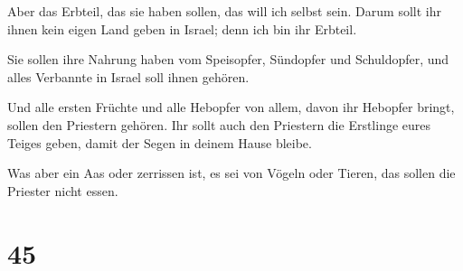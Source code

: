  Aber das Erbteil, das sie haben sollen, das will ich
selbst sein. Darum sollt ihr ihnen kein eigen Land geben in Israel; denn
ich bin ihr Erbteil.

 Sie sollen ihre Nahrung haben vom Speisopfer, Sündopfer
und Schuldopfer, und alles Verbannte in Israel soll ihnen gehören.

 Und alle ersten Früchte und alle Hebopfer von allem,
davon ihr Hebopfer bringt, sollen den Priestern gehören. Ihr sollt auch
den Priestern die Erstlinge eures Teiges geben, damit der Segen in
deinem Hause bleibe.

 Was aber ein Aas oder zerrissen ist, es sei von Vögeln
oder Tieren, das sollen die Priester nicht essen.

\hypertarget{section-44}{%
\section{45}\label{section-44}}

